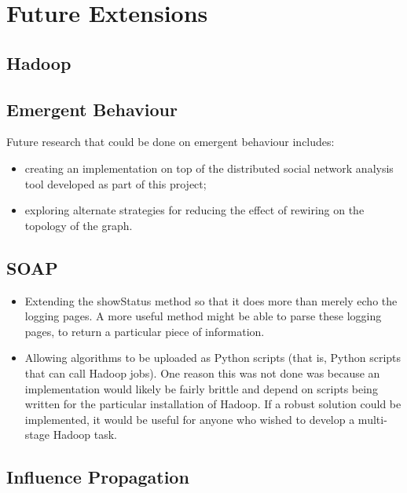 \section{Future Extensions}


\subsection{Hadoop}

\subsection{Emergent Behaviour}

Future research that could be done on emergent behaviour includes:

\begin{itemize}
	\item creating an implementation on top of the distributed social network analysis tool developed as part of this project;
	\item exploring alternate strategies for reducing the effect of rewiring on the topology of the graph.
\end{itemize}

\subsection{SOAP}

\begin{itemize}
	\item Extending the showStatus method so that it does more than merely echo the logging pages. A more useful method might be able to parse these logging pages, to return a particular piece of information.
	\item Allowing algorithms to be uploaded as Python scripts (that is, Python scripts that can call Hadoop jobs). One reason this was not done was because an implementation would likely be fairly brittle and depend on scripts being written for the particular installation of Hadoop. If a robust solution could be implemented, it would be useful for anyone who wished to develop a multi-stage Hadoop task. 
\end{itemize}

\subsection{Influence Propagation}

